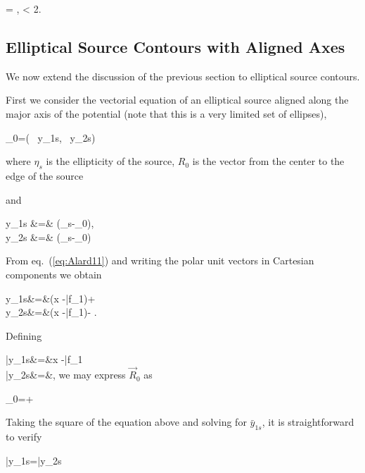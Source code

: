 \beq
\label{eq:parametricarcs}
= ,  \leq \te < 2\pi.
\eeq


\subsection{Elliptical Source Contours with Aligned Axes}

We now extend the discussion of the previous section to elliptical
source contours.

First we consider the vectorial equation of an elliptical source
aligned along the major axis of the potential (note that this is a
very limited set of ellipses),

\beq
\label{eq:ellipse}
_0=\left( \, y_{1s}, \, y_{2s}\right)
\eeq

where $\eta_s$ is the ellipticity of the source, $R_0$ is the vector from the center to the edge of the source

and
 
\bea
y_{1s} &=& (_s-_0)\cdot{}, \\
y_{2s} &=& (_s-_0)\cdot{}
\eea

From eq.~(\ref{eq:Alard11}) and writing the polar unit vectors in Cartesian components we obtain

\bea
y_{1s}&=&(\kt x -\bar{f}_1)\cos{\te}+\sin{\te} \label{y_1s}\\
y_{2s}&=&(\kt x -\bar{f}_1)\sin{\te}-\cos{\te} \label{y_2s}.
\eea

Defining

\bea
\bar{y}_{1s}&=&\kt x -\bar{f}_1\label{bar_y1}\\
\bar{y}_{2s}&=&,\label{bar_y2}
\eea
we may express $\vec{R}_0$ as

\beq
{}_0=\hat{\imath}+\hat{\jmath}
\eeq

Taking the square of the equation above and solving for $\bar{y}_{1s}$, it is straightforward to verify

\beq
\bar{y}_{1s}=\bar{y}_{2s}\pm {}
\eeq

